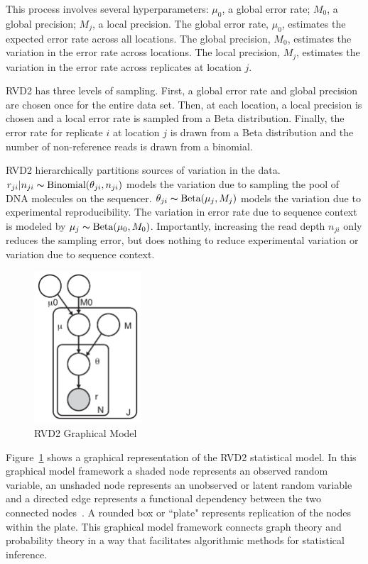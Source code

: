 \documentclass[11pt,reqno]{amsart}
\begin{document}
This process involves several hyperparameters: $\mu_0$, a global error rate; $M_0$, a global precision; $M_j$, a local precision. The global error rate, $\mu_0$, estimates the expected error rate across all locations. The global precision, $M_0$, estimates the variation in the error rate  across locations. The local precision, $M_j$, estimates the variation in the error rate across replicates at location $j$.

RVD2 has three levels of sampling. First, a global error rate and global precision are chosen once for the entire data set. Then, at each location, a local precision is chosen and a local error rate is sampled from a Beta distribution. Finally, the error rate for replicate $i$ at location $j$ is drawn from a Beta distribution and the number of non-reference reads is drawn from a binomial.

RVD2 hierarchically partitions sources of variation in the data. $r_{ji} | n_{ji} \thicksim \text{Binomial}(\theta_{ji}, n_{ji})$ models the variation due to sampling the pool of DNA molecules on the sequencer. $\theta_{ji} \thicksim \text{Beta}(\mu_j, M_j)$ models the variation due to experimental reproducibility. The variation in error rate due to sequence context is modeled by $\mu_j \thicksim \text{Beta}(\mu_0, M_0)$. Importantly, increasing the read depth $n_{ji}$ only reduces the sampling error, but does nothing to reduce experimental variation or variation due to sequence context.

\begin{figure}[h]
\begin{center}
\includegraphics[width=40mm]{pdf_figs/RVD2_model.pdf}
\caption{RVD2 Graphical Model}
\label{fig:graphical_model}
\end{center}
\end{figure}

Figure~\ref{fig:graphical_model} shows a graphical representation of the RVD2 statistical model. In this graphical model framework a shaded node represents an observed random variable, an unshaded node represents an unobserved or latent random variable and a directed edge represents a functional dependency between the two connected nodes~\cite{}. A rounded box or ``plate" represents replication of the nodes within the plate. This graphical model framework connects graph theory and probability theory in a way that facilitates algorithmic methods for statistical inference.
\end{document}
